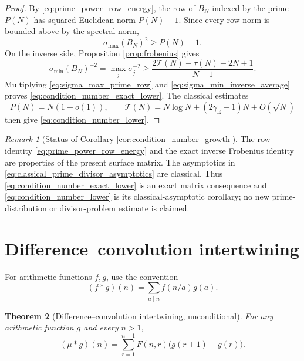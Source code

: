 \documentclass[11pt]{amsart}
\numberwithin{equation}{section}
\theoremstyle{plain}
\newtheorem{theorem}{Theorem}[section]
\theoremstyle{definition}
\theoremstyle{remark}
\newtheorem{remark}[theorem]{Remark}
\newcommand{\mob}{\mu}
\newcommand{\Fsurf}{F}
\newcommand{\TauSum}{\mathcal T}
\begin{document}
\begin{proof}
By \eqref{eq:prime_power_row_energy}, the row of $B_N$ indexed by the prime $P(N)$ has squared Euclidean norm $P(N)-1$.  Since every row norm is bounded above by the spectral norm,
\begin{equation}
\sigma_{\max}(B_N)^2\ge P(N)-1.
\label{eq:sigma_max_prime_row}
\end{equation}
On the inverse side, Proposition \ref{prop:frobenius} gives
\begin{equation}
\sigma_{\min}(B_N)^{-2}
=\max_j\sigma_j^{-2}
\ge
\frac{2\TauSum(N)-\tau(N)-2N+1}{N-1}.
\label{eq:sigma_min_inverse_average}
\end{equation}
Multiplying \eqref{eq:sigma_max_prime_row} and \eqref{eq:sigma_min_inverse_average} proves \eqref{eq:condition_number_exact_lower}.  The classical estimates
\begin{equation}
P(N)=N(1+o(1)),
\qquad
\TauSum(N)=N\log N+(2\gamma_{\mathrm E}-1)N+O(\sqrt N)
\label{eq:classical_prime_divisor_asymptotics}
\end{equation}
then give \eqref{eq:condition_number_lower}.
\end{proof}

\begin{remark}[Status of Corollary \ref{cor:condition_number_growth}]
The row identity \eqref{eq:prime_power_row_energy} and the exact inverse Frobenius identity are properties of the present surface matrix.  The asymptotics in \eqref{eq:classical_prime_divisor_asymptotics} are classical.  Thus \eqref{eq:condition_number_exact_lower} is an exact matrix consequence and \eqref{eq:condition_number_lower} is its classical-asymptotic corollary; no new prime-distribution or divisor-problem estimate is claimed.
\end{remark}

\section{Difference--convolution intertwining}
\label{sec:intertwining}

For arithmetic functions $f,g$, use the convention
\begin{equation}
(f*g)(n)=\sum_{a\mid n}f(n/a)g(a).
\label{eq:dirichlet_convolution}
\end{equation}

\begin{theorem}[Difference--convolution intertwining, unconditional]
\label{thm:intertwining}
For any arithmetic function $g$ and every $n>1$,
\begin{equation}
(\mob*g)(n)=\sum_{r=1}^{n-1}\Fsurf(n,r)\bigl(g(r+1)-g(r)\bigr).
\label{eq:intertwining}
\end{equation}
\end{theorem}
\end{document}
